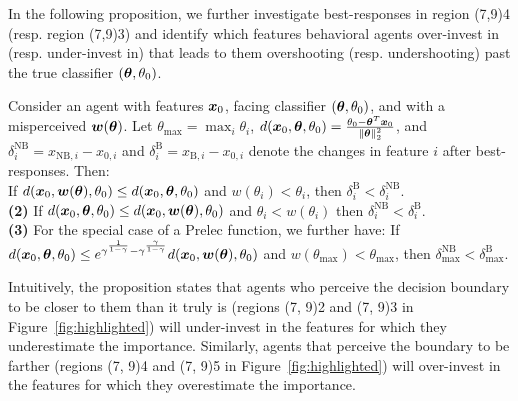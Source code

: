 In the following proposition, we further investigate best-responses in region \framebox(7,9){4} (resp. region \framebox(7,9){3}) and identify which features behavioral agents over-invest in (resp. under-invest in) that leads to them overshooting (resp. undershooting) past the true classifier $({\bm{\theta}}, \theta_0)$. 
\begin{proposition}\label{prop:under-invest-high-dim}
Consider an agent with features ${\bm{x}}_0$, facing classifier $({\bm{\theta}}, \theta_0)$, and with a misperceived ${\bm{w}}({\bm{\theta}})$. Let $\theta_{\max}=\max_i \theta_i$, $d({\bm{x}}_0, {\bm{\theta}}, \theta_0)=\frac{\theta_0-{\bm{\theta}}^T{\bm{x}}_0}{\norm{{\bm{\theta}}}_2^2}$, and  $\delta^{\text{NB}}_i=x_{\text{NB},i}-x_{0,i}$ and $\delta^{\text{B}}_i=x_{\text{B},i}-x_{0,i}$ denote the changes in feature $i$ after best-responses. Then:\\[2pt]
     If $d({\bm{x}}_0, {\bm{w}}({\bm{\theta}}), \theta_0)\le d({\bm{x}}_0, {\bm{\theta}}, \theta_0)$ and $w(\theta_i)<\theta_i$, then $\delta_i^{\text{B}}<\delta_i^{\text{NB}}$.\\[2pt]
    \hspace*{0.1in}\textbf{(2)} If $d({\bm{x}}_0, {\bm{\theta}}, \theta_0)\le d({\bm{x}}_0, {\bm{w}}({\bm{\theta}}), \theta_0)$ and $\theta_i<w(\theta_i)$ then $\delta_i^{\text{NB}}<\delta_i^{\text{B}}$.\\[2pt]
    \hspace*{0.1in}\textbf{(3)} For the special case of a Prelec function, we further have: If $d({\bm{x}}_0, {\bm{\theta}}, \theta_0) \le e^{\gamma^\frac{1}{1-\gamma}-\gamma^\frac{\gamma}{1-\gamma}} d({\bm{x}}_0, {\bm{w}}({\bm{\theta}}), \theta_0)$ and $w(\theta_{\max})<\theta_{\max}$, then
    $\delta_{\max}^{\text{NB}}<\delta_{\max}^{\text{B}}$. 
\end{proposition}

Intuitively, the proposition states that agents who perceive the decision boundary to be closer to them than it truly is (regions \framebox(7, 9){2} and \framebox(7, 9){3} in Figure~\ref{fig:highlighted}) will under-invest in the features for which they underestimate the importance. Similarly, agents that perceive the boundary to be farther (regions \framebox(7, 9){4} and \framebox(7, 9){5} in Figure~\ref{fig:highlighted}) will over-invest in the features for which they overestimate the importance. 
